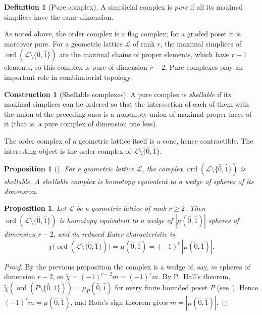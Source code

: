 \documentclass[11pt,a4paper]{article}
\numberwithin{equation}{section}
\theoremstyle{plain}
\newtheorem{proposition}[theorem]{Proposition}
\theoremstyle{definition}
\newtheorem{definition}[theorem]{Definition}
\newtheorem{construction}[theorem]{Construction}
\theoremstyle{remark}
\newcommand{\cL}{\mathcal{L}}
\DeclareMathOperator{\ord}{ord}
\begin{document}
\begin{definition}[Pure complex]
A simplicial complex is \emph{pure} if all its maximal simplices have the same dimension.
\end{definition}

As noted above, the order complex is a flag complex; for a graded poset it is moreover pure. For a geometric lattice $\cL$ of rank $r$, the maximal simplices of $\ord(\cL\setminus\{\hat0,\hat1\})$ are the maximal chains of proper elements, which have $r-1$ elements, so this complex is pure of dimension $r-2$. Pure complexes play an important role in combinatorial topology.

\begin{construction}[Shellable complexes]
A pure complex is \emph{shellable} if its maximal simplices can be ordered so that the intersection of each of them with the union of the preceding ones is a nonempty union of maximal proper faces of it (that is, a pure complex of dimension one less).
\end{construction}

The order complex of a geometric lattice itself is a cone, hence contractible. The interesting object is the order complex of $\cL\setminus\{\hat0,\hat1\}$.

\begin{proposition}[\cite{Bjo92}]
For a geometric lattice $\cL$, the complex $\ord(\cL\setminus\{\hat0,\hat1\})$ is shellable. A shellable complex is homotopy equivalent to a wedge of spheres of its dimension.
\end{proposition}

\begin{proposition}\label{prop:euler}
Let $\cL$ be a geometric lattice of rank $r\geqslant2$. Then $\ord(\cL\setminus\{\hat0,\hat1\})$ is homotopy equivalent to a wedge of $|\mu(\hat0,\hat1)|$ spheres of dimension $r-2$, and its reduced Euler characteristic is
\[
\tilde\chi\bigl(\ord(\cL\setminus\{\hat0,\hat1\})\bigr)=\mu(\hat0,\hat1)=(-1)^r\,|\mu(\hat0,\hat1)|.
\]
\end{proposition}
\begin{proof}
By the previous proposition the complex is a wedge of, say, $m$ spheres of dimension $r-2$, so $\tilde\chi=(-1)^{r-2}m=(-1)^rm$. By P.~Hall's theorem, $\tilde\chi(\ord(P\setminus\{\hat0,\hat1\}))=\mu_P(\hat0,\hat1)$ for every finite bounded poset $P$ (see~\cite{Bjo92}). Hence $(-1)^rm=\mu(\hat0,\hat1)$, and Rota's sign theorem gives $m=|\mu(\hat0,\hat1)|$.
\end{proof}
\end{document}
